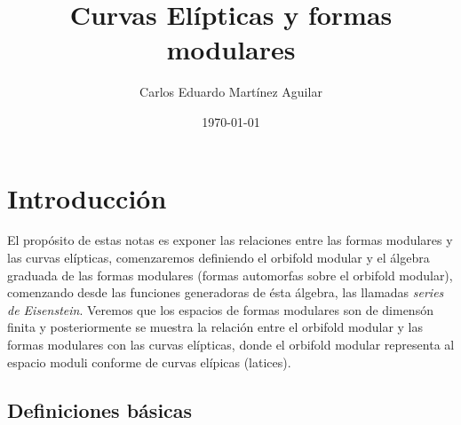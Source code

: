 \documentclass[letterpaper]{article}
\author{Carlos Eduardo Martínez Aguilar}
\date{\today}
\title{Curvas Elípticas y formas modulares}
\begin{document}
\maketitle
\tableofcontents


\section{Introducción}
\noindent El propósito de estas notas es exponer las relaciones entre las formas modulares y las curvas elípticas, comenzaremos definiendo el orbifold modular y el álgebra graduada de las formas modulares (formas automorfas sobre el orbifold modular), comenzando desde las funciones generadoras de ésta álgebra, las llamadas \emph{series de Eisenstein}. Veremos que los espacios de formas modulares son de dimensón finita y posteriormente se muestra la relación entre el orbifold modular y las formas modulares con las curvas elípticas, donde el orbifold modular representa al espacio moduli conforme de curvas elípicas (latices).
\subsection{Definiciones básicas}
\end{document}
